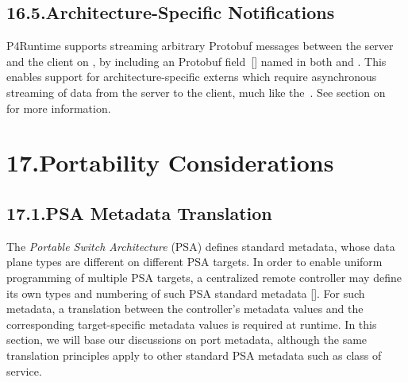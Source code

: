\documentclass[11pt]{article}
\begin{document}
{%
\subsection{16.5.\hspace*{0.5em}Architecture-Specific Notifications}\label{sec-architecture-specific-notifications}%

\noindent{}P4Runtime supports streaming arbitrary Protobuf messages between the server and
the client on , by including an  Protobuf field~[]
named  in both  and . This
enables support for architecture-specific externs which require asynchronous
streaming of data from the server to the client, much like the~. See section on~ for more information.%

\section{17.\hspace*{0.5em}Portability Considerations}\label{sec-portability-considerations}%

\subsection{17.1.\hspace*{0.5em}PSA Metadata Translation}\label{sec-psa-metadata-translation}%

\noindent{}The \emph{Portable Switch Architecture} (PSA) defines standard metadata, whose
data plane types are different on different PSA targets. In order to enable
uniform programming of multiple PSA targets, a centralized remote controller may
define its own types and numbering of such PSA standard metadata
[]. For such metadata, a translation between the controller's
metadata values and the corresponding target-specific metadata values is
required at runtime. In this section, we will base our discussions on port
metadata, although the same translation principles apply to other standard PSA
metadata such as class of service.%

}
\end{document}
